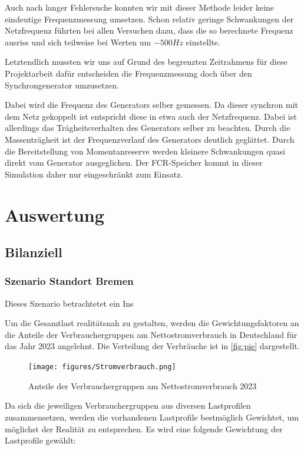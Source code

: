 Auch nach langer Fehlersuche konnten wir mit dieser Methode leider keine eindeutige Frequenzmessung umsetzen.
Schon relativ geringe Schwankungen der Netzfrequenz führten bei allen Versuchen dazu, dass die so berechnete Frequenz
ausriss und sich teilweise bei Werten um $-500 Hz$ einstellte.

Letztendlich mussten wir uns auf Grund des begrenzten Zeitrahmens für diese Projektarbeit dafür entscheiden die Frequenzmessung
doch über den Synchrongenerator umzusetzen.

Dabei wird die Frequenz des Generators selber gemessen.
Da dieser synchron mit dem Netz gekoppelt ist entspricht diese in etwa auch der Netzfrequenz.
Dabei ist allerdings das Trägheitsverhalten des Generators selber zu beachten.
Durch die Massenträgheit ist der Frequenzverlauf des Generators deutlich geglättet.
Durch die Bereitstellung von Momentanreserve werden kleinere Schwankungen quasi direkt vom Generator ausgeglichen.
Der FCR-Speicher kommt in dieser Simulation daher nur eingeschränkt zum Einsatz.



\chapter{Auswertung}

\section{Bilanziell}




\subsection{Szenario Standort Bremen}

Dieses Szenario betrachtetet ein Ins

Um die Gesamtlast realitätsnah zu gestalten, werden die Gewichtungsfaktoren an die Anteile der Verbrauchergruppen am Nettostromverbrauch in Deutschland für das Jahr 2023 angelehnt. Die Verteilung der Verbräuche ist in \autoref{fig:pie} dargestellt.

\begin{figure}[H]
	\centering
	\texttt{[image: figures/Stromverbrauch.png]}
	\caption{Anteile der Verbrauchergruppen am Nettostromverbrauch 2023}
	\label{fig:pie}
\end{figure}

Da sich die jeweiligen Verbrauchergruppen aus diversen Lastprofilen zusammensetzen, werden die vorhandenen Lastprofile bestmöglich Gewichtet, um möglichst der Realität zu entsprechen. Es wird eine folgende Gewichtung der Lastprofile gewählt:

